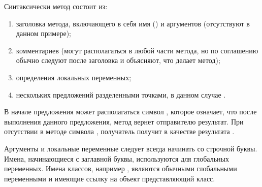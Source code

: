 \documentclass[a4paper,10pt,twoside]{book}
\begin{document}
Синтаксически метод состоит из:
\begin{enumerate}
	\item заголовка метода, включающего в себя имя (\ie {}) и аргументов (отсутствуют в данном примере);
	\item комментариев (могут располагаться в любой части метода, но по соглашению обычно следуют после заголовка и объясняют, что делает метод);
	\item определения локальных переменных;
	\item нескольких предложений разделенными точками, в данном случае .
\end{enumerate}


В начале предложения может располагаться символ  \ct{^}, которое означает,
что после выполнения данного предложения, метод вернет отправителю результат.
При отсутствии в методе символа \ct{^}, получатель получит в качестве результата .


Аргументы и локальные переменные следует всегда начинать со строчной буквы.
Имена, начинающиеся с заглавной буквы, используются для глобальных переменных.
Имена классов, например , являются обычными глобальными переменными и имеющие ссылку на объект представляющий класс.

\end{document}

